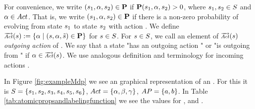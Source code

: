 \documentclass[preview]{standalone}
\begin{document}
For convenience, we write $({s}_1, {\alpha}, {s}_2) \in {\textbf{P}}$ if ${\textbf{P}}({s}_1, {\alpha}, {s}_2) > 0$, where ${s}_1, {s}_2 \in {S}$ and ${\alpha} \in {Act}$. That is, we write $({s}_1, {\alpha}, {s}_2) \in {\textbf{P}}$ if there is a non-zero probability of evolving from state ${s}_1$ to state ${s}_2$ with action \action.
We define $\outacts(\state) := \{\action \mid (\state,\action,\smstate) \in \trans\}$ for ${s} \in {S}$. For ${s} \in {S}$, we call an element of $\outacts(\state)$ \emph{outgoing action} of \state. We say that a state \state "has an outgoing action \action" or "\action is outgoing from \state" if $\action \in \outacts(\state)$. We use analogous definition and terminology for incoming actions \inacts. 

\begin{exmp}
In Figure \ref{fig:exampleMdp} we see an graphical representation of an \mdpN. For this \mdpN it is ${S} = \{{s}_1, {s}_2, {s}_3, {s}_4, {s}_5, {s}_6\}$, ${Act} = \{{\alpha}, {\beta}, {\gamma}\}$, ${AP} = \{a,b\}$. In Table \ref{tab:atomicpropsandlabelingfunction} we see the values for , \initdistrib and \trans.


\end{exmp}
\end{document}
